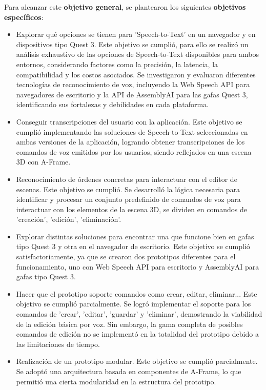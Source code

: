 \documentclass[a4paper, 12pt]{book}
\begin{document}
Para alcanzar este \textbf{objetivo general}, se plantearon los siguientes \textbf{objetivos específicos}:
\begin{itemize}
  \item Explorar qué opciones se tienen para 'Speech-to-Text' en un navegador y en dispositivos tipo Quest 3.
  Este objetivo se cumplió, para ello se realizó un análisis exhaustivo de las opciones de Speech-to-Text disponibles para ambos entornos, considerando factores como la precisión, la latencia, la compatibilidad y los costos asociados.
  Se investigaron y evaluaron diferentes tecnologías de reconocimiento de voz, incluyendo la Web Speech API para navegadores de escritorio y la API de AssemblyAI para las gafas Quest 3, identificando sus fortalezas y debilidades en cada plataforma.
  \item Conseguir transcripciones del usuario con la aplicación.
  Este objetivo se cumplió implementando las soluciones de Speech-to-Text seleccionadas en ambas versiones de la aplicación, logrando obtener transcripciones de los comandos de voz emitidos por los usuarios, siendo reflejados en una escena 3D con A-Frame.
  \item Reconocimiento de órdenes concretas para interactuar con el editor de escenas.
  Este objetivo se cumplió. Se desarrolló la lógica necesaria para identificar y procesar un conjunto predefinido de comandos de voz para interactuar con los elementos de la escena 3D, se dividen en comandos de 'creación', 'edición', 'eliminación'.
  \item Explorar distintas soluciones para encontrar una que funcione bien en gafas tipo Quest 3 y otra en el navegador de escritorio.
  Este objetivo se cumplió satisfactoriamente, ya que se crearon dos prototipos diferentes para el funcionamiento, uno con Web Speech API para escritorio y AssemblyAI para gafas tipo Quest 3.
  \item Hacer que el prototipo soporte comandos como crear, editar, eliminar...
  Este objetivo se cumplió parcialmente. Se logró implementar el soporte para los comandos de 'crear', 'editar', 'guardar' y 'eliminar', demostrando la viabilidad de la edición básica por voz.
  Sin embargo, la gama completa de posibles comandos de edición no se implementó en la totalidad del prototipo debido a las limitaciones de tiempo.
  \item Realización de un prototipo modular. Este objetivo se cumplió parcialmente. Se adoptó una arquitectura basada en componentes de A-Frame, lo que permitió una cierta modularidad en la estructura del prototipo.

\end{itemize}
\end{document}
